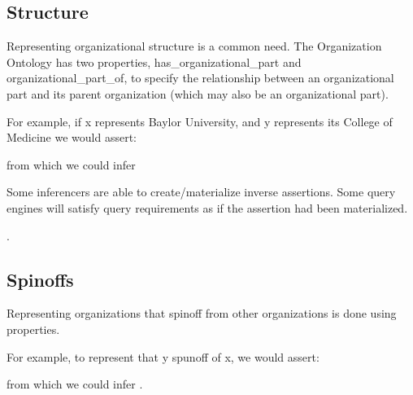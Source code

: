 \documentclass[letterpaper,10pt,english]{sphinxmanual}
\begin{document}
\subsection{Structure}
\label{\detokenize{associations:structure}}
\sphinxAtStartPar
Representing organizational structure is a common need.  The Organization Ontology
has two properties, has\_organizational\_part and organizational\_part\_of, to specify the
relationship between an organizational part and its parent organization (which may also
be an organizational part).

\sphinxAtStartPar
For example, if x represents Baylor University, and y represents its College of Medicine
we would assert:

\begin{sphinxVerbatim}[commandchars=\\\{\}]
  
\end{sphinxVerbatim}

\sphinxAtStartPar
from which we could infer  \sphinxstepexplicit %
\begin{footnote}[2]\label{\thesphinxscope.2}%
\sphinxAtStartFootnote
Some inferencers are able to create/materialize inverse assertions.  Some query
engines will satisfy query requirements as if the assertion had been materialized.
%
\end{footnote}.


\subsection{Spin\sphinxhyphen{}offs}
\label{\detokenize{associations:spin-offs}}
\sphinxAtStartPar
Representing organizations that spin\sphinxhyphen{}off from other organizations is done
using  properties.

\sphinxAtStartPar
For example, to represent that y spun\sphinxhyphen{}off of x, we would assert:

\begin{sphinxVerbatim}[commandchars=\\\{\}]
  
\end{sphinxVerbatim}

\sphinxAtStartPar
from which we could infer  \sphinxfootnotemark[2].
\end{document}
